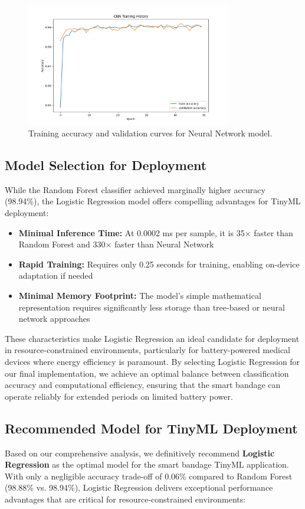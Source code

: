 \documentclass[conference]{IEEEtran}
\begin{document}
\begin{figure}[H]
    \centering
    \includegraphics[width=0.8\textwidth]{figures/cnn_training_history.png}
    \caption{Training accuracy and validation curves for Neural Network model.}
    \label{fig:cnn_training}
\end{figure}

\subsection{Model Selection for Deployment}
While the Random Forest classifier achieved marginally higher accuracy (98.94\%), the Logistic Regression model offers compelling advantages for TinyML deployment:

\begin{itemize}
    \item \textbf{Minimal Inference Time:} At 0.0002 ms per sample, it is 35× faster than Random Forest and 330× faster than Neural Network
    \item \textbf{Rapid Training:} Requires only 0.25 seconds for training, enabling on-device adaptation if needed
    \item \textbf{Minimal Memory Footprint:} The model's simple mathematical representation requires significantly less storage than tree-based or neural network approaches
\end{itemize}

These characteristics make Logistic Regression an ideal candidate for deployment in resource-constrained environments, particularly for battery-powered medical devices where energy efficiency is paramount. By selecting Logistic Regression for our final implementation, we achieve an optimal balance between classification accuracy and computational efficiency, ensuring that the smart bandage can operate reliably for extended periods on limited battery power.

\subsection{Recommended Model for TinyML Deployment}
Based on our comprehensive analysis, we definitively recommend \textbf{Logistic Regression} as the optimal model for the smart bandage TinyML application. With only a negligible accuracy trade-off of 0.06\% compared to Random Forest (98.88\% vs. 98.94\%), Logistic Regression delivers exceptional performance advantages that are critical for resource-constrained environments:
\end{document}
